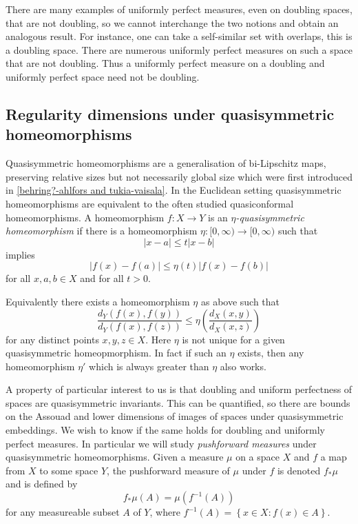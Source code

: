 \documentclass[12pt]{amsart}
\numberwithin{equation}{section}
\renewcommand{\le}{\leqslant}
\begin{document}
There are many examples of uniformly perfect measures, even on doubling spaces, that are not doubling, so we cannot interchange the two notions and obtain an analogous result.  For instance, one can take a self-similar set with overlaps, this is a doubling space. There are numerous uniformly perfect measures on such a space that are not doubling. Thus a uniformly perfect measure on a doubling and uniformly perfect space need not be doubling.







\subsection{Regularity dimensions under quasisymmetric homeomorphisms}


Quasisymmetric homeomorphisms are a generalisation of bi-Lipschitz maps, preserving relative sizes but not necessarily global size which were first introduced in \ref{behring?-ahlfors and tukia-vaisala}. In the Euclidean setting quasisymmetric homeomorphisms are equivalent to the often studied quasiconformal homeomorphisms. A homeomorphism $f\colon X \rightarrow Y$ is an \textit{$\eta$-quasisymmetric homeomorphism} if there is a homeomorphism $\eta \colon [0,\infty) \rightarrow [0,\infty)$ such that 
\[
\lvert x - a \rvert \le t\lvert x - b \rvert
\]
implies 
\[
\lvert f(x) - f(a) \rvert \le \eta(t) \lvert f(x) - f(b) \rvert
\]
for all $x,a,b \in X$ and for all $t>0$.


Equivalently there exists a homeomorphism $\eta$ as above such that 
\[
\frac{d_Y(f(x),f(y))}{d_Y(f(x),f(z))} \le \eta \left(\frac{d_X(x,y)}{d_X(x,z)} \right)
\]
for any distinct points $x,y,z \in X$. Here $\eta$ is not unique for a given quasisymmetric homeopmorphism. In fact if such an $\eta$ exists, then any homeomorphism $\eta'$ which is always greater than $\eta$ also works. 


A property of particular interest to us is that doubling and uniform perfectness of spaces are quasisymmetric invariants. This can be quantified, so there are bounds on the Assouad and lower dimensions of images of spaces under quasisymmetric embeddings. We wish to know if the same holds for doubling and uniformly perfect measures. In particular we will study \textit{pushforward measures} under quasisymmetric homeomorphisms. Given a measure $\mu$ on a space $X$ and $f$ a map from $X$ to some space $Y$, the pushforward measure of $\mu$ under $f$ is denoted $f_*\mu$ and is defined by
\[
f_*\mu (A) = \mu(f^{-1}(A))
\]
for any measureable subset $A$ of $Y$, where $f^{-1}(A) = \left\{x \in X \colon f(x) \in A \right\}$. 
\end{document}
